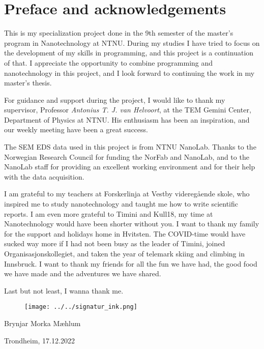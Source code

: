 \chapter*{Preface and acknowledgements}


This is my specialization project done in the 9th semester of the master's program in Nanotechnology at NTNU.
During my studies I have tried to focus on the development of my skills in programming, and this project is a continuation of that.
I appreciate the opportunity to combine programming and nanotechnology in this project, and I look forward to continuing the work in my master's thesis.

For guidance and support during the project, I would like to thank my supervisor, Professor \textit{Antonius T. J. van Helvoort}, at the TEM Gemini Center, Department of Physics at NTNU.
His enthusiasm has been an inspiration, and our weekly meeting have been a great success.

The SEM EDS data used in this project is from NTNU NanoLab.
Thanks to the Norwegian Research Council for funding the NorFab and NanoLab, and to the NanoLab staff for providing an excellent working environment and for their help with the data acquisition.


I am grateful to my teachers at Forskerlinja at Vestby videregående skole, who inspired me to study nanotechnology and taught me how to write scientific reports.
I am even more grateful to Timini and Kull18, my time at Nanotechnology would have been shorter without you.
I want to thank my family for the support and holidays home in Hvitsten.
The COVID-time would have sucked way more if I had not been busy as the leader of Timini, joined Organisasjonskollegiet, and taken the year of telemark skiing and climbing in Innsbruck.
I want to thank my friends for all the fun we have had, the good food we have made and the adventures we have shared.

Last but not least, I wanna thank me.


\begin{figure}[ht]
    \texttt{[image: ../../signatur\_ink.png]}
    \label{fig:signatur}
\end{figure}

Brynjar Morka Mæhlum

Trondheim, 17.12.2022
